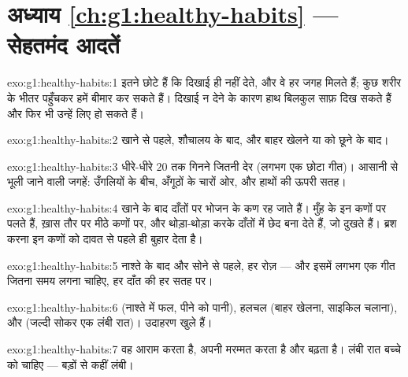 \section*{अध्याय \ref{ch:g1:healthy-habits} --- सेहतमंद आदतें}

\begin{solution}{exo:g1:healthy-habits:1}
 इतने छोटे  हैं कि दिखाई ही नहीं देते, और वे हर जगह मिलते
हैं; कुछ शरीर के भीतर पहुँचकर हमें बीमार कर सकते हैं। दिखाई न देने के
कारण हाथ बिलकुल साफ़ दिख सकते हैं और फिर भी उन्हें लिए हो सकते हैं।
\end{solution}

\begin{solution}{exo:g1:healthy-habits:2}
खाने से पहले, शौचालय के बाद, और बाहर खेलने या  को छूने के बाद।
\end{solution}

\begin{solution}{exo:g1:healthy-habits:3}
धीरे-धीरे $20$ तक गिनने जितनी देर (लगभग एक छोटा गीत)। आसानी से भूली
जाने वाली जगहें: उँगलियों के बीच, अँगूठों के चारों ओर, और हाथों की
ऊपरी सतह।
\end{solution}

\begin{solution}{exo:g1:healthy-habits:4}
खाने के बाद दाँतों पर भोजन के कण रह जाते हैं। मुँह के  इन कणों
पर पलते हैं, ख़ास तौर पर मीठे कणों पर, और थोड़ा-थोड़ा करके दाँतों में
छेद बना देते हैं, जो दुखते हैं। ब्रश करना इन कणों को दावत से पहले ही
बुहार देता है।
\end{solution}

\begin{solution}{exo:g1:healthy-habits:5}
नाश्ते के बाद और सोने से पहले, हर रोज़ --- और इसमें लगभग एक गीत जितना
समय लगना चाहिए, हर दाँत की हर सतह पर।
\end{solution}

\begin{solution}{exo:g1:healthy-habits:6}
 (नाश्ते में फल, पीने को पानी), हलचल (बाहर खेलना, साइकिल
चलाना), और  (जल्दी सोकर एक लंबी रात)। उदाहरण खुले हैं।
\end{solution}

\begin{solution}{exo:g1:healthy-habits:7}
वह आराम करता है, अपनी मरम्मत करता है और बढ़ता है। लंबी रात बच्चे को
चाहिए --- बड़ों से कहीं लंबी।
\end{solution}

